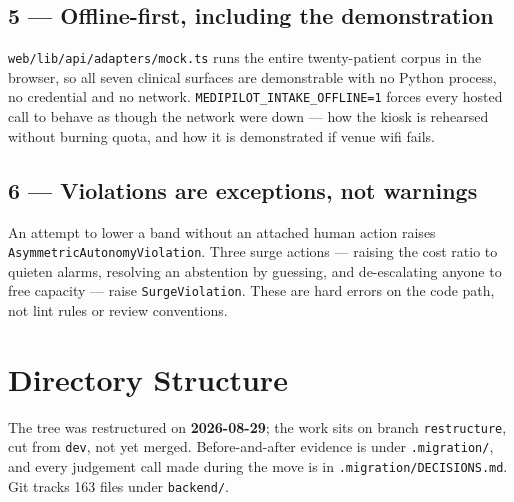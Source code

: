\documentclass[10pt,a4paper,twocolumn]{article}
\newcommand{\pth}[1]{\textcolor{SecPurple}{\texttt{#1}}}
\newcommand{\cm}[1]{\texttt{#1}}
\begin{document}
\subsection{5 --- Offline-first, including the demonstration}
\pth{web/lib/api/adapters/mock.ts} runs the entire twenty-patient corpus in the browser, so all
seven clinical surfaces are demonstrable with no Python process, no credential and no network.
\cm{MEDIPILOT\_INTAKE\_OFFLINE=1} forces every hosted call to behave as though the network were
down --- how the kiosk is rehearsed without burning quota, and how it is demonstrated if venue wifi
fails.

\subsection{6 --- Violations are exceptions, not warnings}
An attempt to lower a band without an attached human action raises
\cm{AsymmetricAutonomyViolation}. Three surge actions --- raising the cost ratio to quieten alarms,
resolving an abstention by guessing, and de-escalating anyone to free capacity --- raise
\cm{SurgeViolation}. These are hard errors on the code path, not lint rules or review conventions.

\section{Directory Structure}
\label{sec:tree}

The tree was restructured on \textbf{2026-08-29}; the work sits on branch \cm{restructure}, cut
from \cm{dev}, not yet merged. Before-and-after evidence is under \pth{.migration/}, and every
judgement call made during the move is in \pth{.migration/DECISIONS.md}. Git tracks 163 files
under \pth{backend/}.
\end{document}
